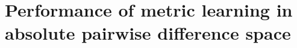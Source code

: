 
\chapter{Performance of metric learning in absolute pairwise difference space}
\label{apx:adsmetric}



%
%
%
%
%
%
%
%
%
%
